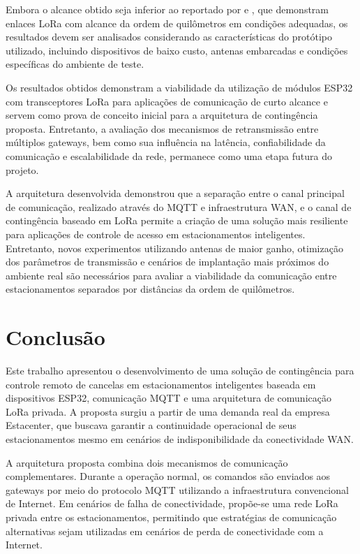 \documentclass[
article,            %
11pt,               %
twoside,            %
a4paper,            %
section=TITLE,      %
onecolumn,          %
english,            %
brazil,             %
sumario=tradicional
]{abntex2}
\begin{document}
Embora o alcance obtido seja inferior ao reportado por  e , que demonstram enlaces LoRa com alcance da ordem de quilômetros em condições adequadas, os resultados devem ser analisados considerando as características do protótipo utilizado, incluindo dispositivos de baixo custo, antenas embarcadas e condições específicas do ambiente de teste.

Os resultados obtidos demonstram a viabilidade da utilização de módulos ESP32 com transceptores LoRa para aplicações de comunicação de curto alcance e servem como prova de conceito inicial para a arquitetura de contingência proposta. Entretanto, a avaliação dos mecanismos de retransmissão entre múltiplos gateways, bem como sua influência na latência, confiabilidade da comunicação e escalabilidade da rede, permanece como uma etapa futura do projeto.

A arquitetura desenvolvida demonstrou que a separação entre o canal principal de comunicação, realizado através do MQTT e infraestrutura WAN, e o canal de contingência baseado em LoRa permite a criação de uma solução mais resiliente para aplicações de controle de acesso em estacionamentos inteligentes. Entretanto, novos experimentos utilizando antenas de maior ganho, otimização dos parâmetros de transmissão e cenários de implantação mais próximos do ambiente real são necessários para avaliar a viabilidade da comunicação entre estacionamentos separados por distâncias da ordem de quilômetros.

\section{Conclusão}

Este trabalho apresentou o desenvolvimento de uma solução de contingência para controle remoto de cancelas em estacionamentos inteligentes baseada em dispositivos ESP32, comunicação MQTT e uma arquitetura de comunicação LoRa privada. A proposta surgiu a partir de uma demanda real da empresa Estacenter, que buscava garantir a continuidade operacional de seus estacionamentos mesmo em cenários de indisponibilidade da conectividade WAN.

A arquitetura proposta combina dois mecanismos de comunicação complementares. Durante a operação normal, os comandos são enviados aos gateways por meio do protocolo MQTT utilizando a infraestrutura convencional de Internet. Em cenários de falha de conectividade, propõe-se uma rede LoRa privada entre os estacionamentos, permitindo que estratégias de comunicação alternativas sejam utilizadas em cenários de perda de conectividade com a Internet.
\end{document}
